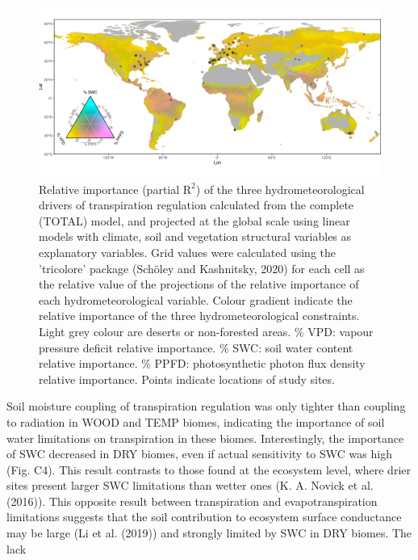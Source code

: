 \documentclass[11pt,twoside]{reedthesis}
\begin{document}
\begin{figure}[hbt!]

{\centering \includegraphics[width=1\linewidth]{figure/CH4/Figure3} 

}

\caption[Relative importance (partial $\text{R}^2$) of the three hydrometeorological drivers of transpiration regulation.]{Relative importance (partial $\text{R}^2$) of the three hydrometeorological drivers of transpiration regulation calculated from the complete (TOTAL) model, and projected at the global scale using linear models with climate, soil and vegetation structural variables as explanatory variables. Grid values were calculated using the 'tricolore' package (Schöley and Kashnitsky, 2020) for each cell as the relative value of the projections of the relative importance of each hydrometeorological variable. Colour gradient indicate the relative importance of the three hydrometeorological constraints. Light grey colour are deserts or non-forested areas.  \% VPD: vapour pressure deficit relative importance. \% SWC: soil water content relative importance. \% PPFD: photosynthetic photon flux density relative importance. Points indicate locations of study sites.}\label{fig:ch4fig3}
\end{figure}
Soil moisture coupling of transpiration regulation was only tighter than
coupling to radiation in WOOD and TEMP biomes, indicating the importance
of soil water limitations on transpiration in these biomes.
Interestingly, the importance of SWC decreased in DRY biomes, even if
actual sensitivity to SWC was high (Fig. C4). This result contrasts to
those found at the ecosystem level, where drier sites present larger SWC
limitations than wetter ones (K. A. Novick et al. (2016)). This opposite
result between transpiration and evapotranspiration limitations suggests
that the soil contribution to ecosystem surface conductance may be large
(Li et al. (2019)) and strongly limited by SWC in DRY biomes. The lack
\end{document}
